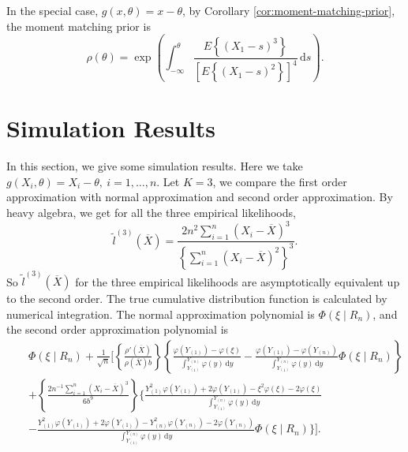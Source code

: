 \documentclass[oneside,english]{amsbook}
\numberwithin{section}{chapter}
\numberwithin{equation}{section}
\numberwithin{figure}{section}
\theoremstyle{plain}
\theoremstyle{plain}
\theoremstyle{definition}
\theoremstyle{plain}
\theoremstyle{plain}
\theoremstyle{remark}
\theoremstyle{definition}
\theoremstyle{definition}
\newcommand{\diff}{\,\mathrm{d}}
\begin{document}
In {the} special case,  $g\left(x,\theta\right)=x-\theta$, {by} Corollary \ref{cor:moment-matching-prior}, the moment matching prior is 
\[
	\rho\left(\theta\right)=\exp\left(\int_{-\infty}^{\theta}\frac{E\left\{\left(X_1-s\right)^3\right\}}{\left[E\left\{\left(X_1-s\right)^2\right\}\right]^4}\diff s\right).
\]

\section{Simulation Results }


In this section, we give some simulation results. Here we take $g\left(X_{i},\theta\right)=X_{i}-\theta,\: i=1,\ldots,n$.
Let $K=3$, we compare the first order approximation with normal approximation
and second order approximation. By heavy algebra, we get for all the
three empirical likelihoods, 
\[
\tilde{l}^{\left(3\right)}\left(\overline{X}\right)=\frac{2n^{2}\sum_{i=1}^{n}\left(X_{i}-\overline{X}\right)^{3}}{\left\{ \sum_{i=1}^{n}\left(X_{i}-\overline{X}\right)^{2}\right\} ^{3}}.
\]
So  $\tilde{l}^{\left(3\right)}\left(\overline{X}\right)$ for
the three empirical likelihoods are asymptotically equivalent up to
the second order. The true cumulative distribution function is calculated
by numerical integration. The normal approximation polynomial
is $\Phi\left(\xi\mid R_{n}\right)$, and the second order approximation
polynomial is 
\begin{eqnarray*}
 &  & \Phi\left(\xi\mid R_{n}\right)+\frac{1}{\sqrt{n}}\Bigg[\left\{ \frac{\rho'\left(\overline{X}\right)}{\rho\left(\overline{X}\right)b}\right\} \left\{ \frac{\varphi\left(Y_{\left(1\right)}\right)-\varphi\left(\xi\right)}{\int_{Y_{\left(1\right)}}^{Y_{\left(n\right)}}\varphi\left(y\right)\diff y}-\frac{\varphi\left(Y_{\left(1\right)}\right)-\varphi\left(Y_{\left(n\right)}\right)}{\int_{Y_{\left(1\right)}}^{Y_{\left(n\right)}}\varphi\left(y\right)\diff y}\Phi\left(\xi\mid R_{n}\right)\right\} \\
 &  & +\left\{ \frac{2n^{-1}\sum_{i=1}^{n}\left(X_{i}-\overline{X}\right)^{3}}{6b^{9}}\right\} \Big\{\frac{Y_{\left(1\right)}^{2}\varphi\left(Y_{\left(1\right)}\right)+2\varphi\left(Y_{\left(1\right)}\right)-\xi^{2}\varphi\left(\xi\right)-2\varphi\left(\xi\right)}{\int_{Y_{\left(1\right)}}^{Y_{\left(n\right)}}\varphi\left(y\right)\diff y}\\
 &  & -\frac{Y_{\left(1\right)}^{2}\varphi\left(Y_{\left(1\right)}\right)+2\varphi\left(Y_{\left(1\right)}\right)-Y_{\left(n\right)}^{2}\varphi\left(Y_{\left(n\right)}\right)-2\varphi\left(Y_{\left(n\right)}\right)}{\int_{Y_{\left(1\right)}}^{Y_{\left(n\right)}}\varphi\left(y\right)\diff y}\Phi\left(\xi\mid R_{n}\right)\Big\}\Bigg].
\end{eqnarray*}
\end{document}
